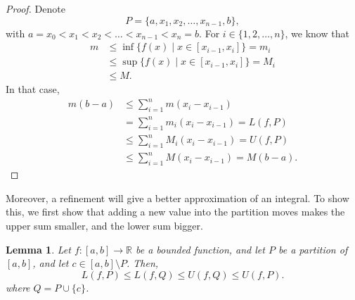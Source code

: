 \documentclass[a4paper, openany]{memoir}
\theoremstyle{definition}
\theoremstyle{plain}
\newtheorem{lemma}[definition]{Lemma}
\begin{document}
\begin{proof}
Denote
\[P = \{a, x_1, x_2, \dots, x_{n-1}, b\},\]
with $a = x_0 < x_1 < x_2 < \dots < x_{n-1} < x_n = b$. For $i \in \{1, 2, \dots, n\}$, we know that
\begin{align*}
    m &\leqslant \inf \{f(x) \mid x \in [x_{i-1}, x_i]\} = m_i \\
    &\leqslant \sup \{f(x) \mid x \in [x_{i-1}, x_i]\} = M_i \\
    &\leqslant M.
\end{align*}
In that case,
\begin{align*}
    m(b - a) &\leqslant \sum_{i=1}^n m(x_i - x_{i-1}) \\
    &= \sum_{i=1}^n m_i (x_i - x_{i-1}) = L(f, P) \\
    &\leqslant \sum_{i=1}^n M_i (x_i - x_{i-1}) = U(f, P) \\
    &\leqslant \sum_{i=1}^n M(x_i - x_{i-1}) = M(b - a).
\end{align*}
\end{proof}
\noindent Moreover, a refinement will give a better approximation of an integral. To show this, we first show that adding a new value into the partition moves makes the upper sum smaller, and the lower sum bigger.
\begin{lemma}
Let $f: [a, b] \to \mathbb{R}$ be a bounded function, and let $P$ be a partition of $[a, b]$, and let $c \in [a, b] \setminus P$. Then,
\[L(f, P) \leqslant L(f, Q) \leqslant U(f, Q) \leqslant U(f, P).\]
where $Q = P \cup \{c\}$.
\end{lemma}
\end{document}
